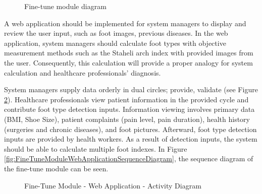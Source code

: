 \begin{figure}[htbp]
\centering
{}
\caption{Fine-tune module diagram}
\label{fig:FineTuneModuleDiagram}
\end{figure}

A web application should be implemented for system managers to display and review the user input, such as foot images, previous diseases. In the web application, system managers should calculate foot types with objective measurement methods such as the Staheli arch index with provided images from the user. Consequently, this calculation will provide a proper analogy for system calculation and healthcare professionals' diagnosis. 


System managers supply data orderly in dual circles; provide, validate (see Figure \ref{fig:FineTuneModuleWebApplicationActivityDiagram}). Healthcare professionals view patient information in the provided cycle and contribute foot type detection inputs. Information viewing involves primary data (BMI, Shoe Size),  patient complaints (pain level, pain duration), health history (surgeries and chronic diseases), and foot pictures. Afterward, foot type detection inputs are provided by health workers. As a result of detection inputs, the system should be able to calculate multiple foot indexes. In Figure \ref{fig:FineTuneModuleWebApplicationSequenceDiagram}, the sequence diagram of the fine-tune module can be seen.

\begin{figure}[htbp]
\centering
{}
\caption{Fine-Tune Module - Web Application - Activity Diagram}
\label{fig:FineTuneModuleWebApplicationActivityDiagram}
\end{figure}

